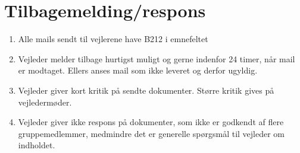 \section{Tilbagemelding/respons}
\begin{enumerate}
\item{Alle mails sendt til vejlerene have B212 i emnefeltet}
\item{Vejleder melder tilbage hurtigst muligt og gerne indenfor 24 timer, når mail er modtaget. Ellers
anses mail som ikke leveret og derfor ugyldig.}
\item{Vejleder giver kort kritik på sendte dokumenter. Større kritik gives på vejledermøder.}
\item{Vejleder giver ikke respons på dokumenter, som ikke er godkendt af flere gruppemedlemmer,
medmindre det er generelle spørgsmål til vejleder om indholdet.}
\end{enumerate}
